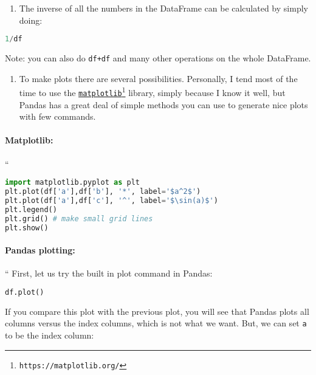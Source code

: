 \documentclass[graybox,sectrefs,envcountresetchap,open=right,final]{svmonodo}
\begin{document}
\begin{enumerate}
\item The inverse of all the numbers in the DataFrame can be calculated by simply doing:
\end{enumerate}

\noindent


\begin{lstlisting}[language=python,style=blue1bar]
1/df

\end{lstlisting}

Note: you can also do \texttt{df+df} and many other operations on the whole DataFrame.

\begin{enumerate}
\item To make plots there are several possibilities. Personally, I tend most of the time to use the  \href{{https://matplotlib.org/}}{\nolinkurl{matplotlib}\footnote{\texttt{https://matplotlib.org/}}} library, simply because I know it well, but Pandas has a great deal of simple methods you can use to generate nice plots with few commands.
\end{enumerate}

\noindent
\paragraph{Matplotlib:}
``







\begin{lstlisting}[language=python,style=blue1bar]
import matplotlib.pyplot as plt
plt.plot(df['a'],df['b'], '*', label='$a^2$')
plt.plot(df['a'],df['c'], '^', label='$\sin(a)$')
plt.legend() 
plt.grid() # make small grid lines
plt.show()

\end{lstlisting}


\paragraph{Pandas plotting:}
``
First, let us try the built in plot command in Pandas:


\begin{lstlisting}[language=python,style=blue1bar]
df.plot()

\end{lstlisting}

If you compare this plot with the previous plot, you will see that Pandas plots all columns versus the index columns, which is not what we want. But, we can set \texttt{a} to be the index column:
\end{document}
